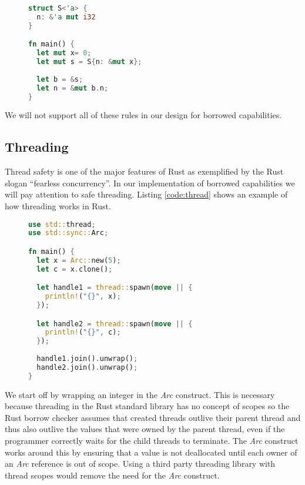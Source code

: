 \begin{figure}[h]
\begin{lstlisting}[language=Rust,frame=single,caption=Mutable reference through shared borrow,label=code:nested_immutmut]
struct S<'a> {
  n: &'a mut i32
}

fn main() {
  let mut x= 0;
  let mut s = S{n: &mut x};
    
  let b = &s;
  let n = &mut b.n;
}
\end{lstlisting}
\end{figure}

We will not support all of these rules in our design for borrowed capabilities.

\subsection{Threading}
Thread safety is one of the major features of Rust as exemplified by the Rust slogan ``fearless concurrency''.
In our implementation of borrowed capabilities we will pay attention to safe threading.
Listing \ref{code:thread} shows an example of how threading works in Rust.

\begin{figure}[h]
\begin{lstlisting}[language=Rust,frame=single,caption=Threading in Rust.,label=code:thread]
use std::thread;
use std::sync::Arc;

fn main() {
  let x = Arc::new(5);
  let c = x.clone();

  let handle1 = thread::spawn(move || {
    println!("{}", x);
  });

  let handle2 = thread::spawn(move || {
    println!("{}", c);
  });
  
  handle1.join().unwrap();
  handle2.join().unwrap();
}
\end{lstlisting}
\end{figure}

We start off by wrapping an integer in the \textit{Arc} construct.
This is necessary because threading in the Rust standard library has no concept of scopes so the Rust borrow checker assumes that created threads outlive their parent thread and thus also outlive the values that were owned by the parent thread, even if the programmer correctly waits for the child threads to terminate.
The \textit{Arc} construct works around this by ensuring that a value is not deallocated until each owner of an \textit{Arc} reference is out of scope.
Using a third party threading library with thread scopes would remove the need for the \textit{Arc} construct.

